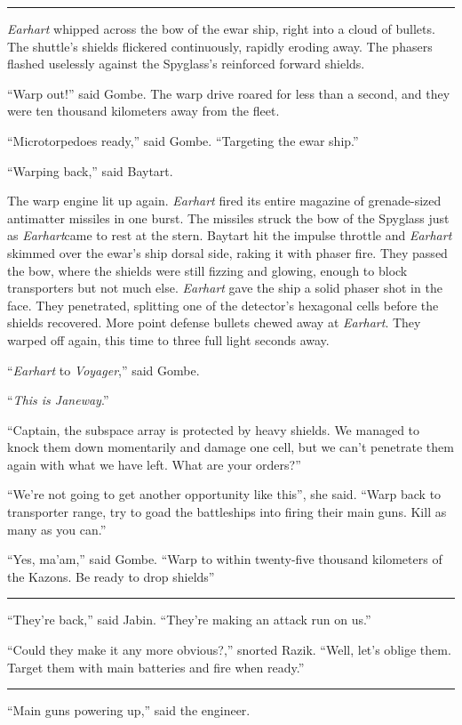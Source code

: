 \documentclass[twoside,letterpaper,12pt]{memoir}
\begin{document}
\fancybreak{\rule{3cm}{0.4 pt}}
\textit{Earhart} whipped across the bow of the ewar ship, right into a cloud of bullets. The shuttle's shields flickered continuously, rapidly eroding away. The phasers flashed uselessly against the Spyglass's reinforced forward shields.

``Warp out!'' said Gombe. The warp drive roared for less than a second, and they were ten thousand kilometers away from the fleet.

``Microtorpedoes ready,'' said Gombe. ``Targeting the ewar ship.''

``Warping back,'' said Baytart.

The warp engine lit up again. \textit{Earhart} fired its entire magazine of grenade-sized antimatter missiles in one burst. The missiles struck the bow of the Spyglass just as \textit{Earhart}came to rest at the stern. Baytart hit the impulse throttle and \textit{Earhart} skimmed over the ewar's ship dorsal side, raking it with phaser fire. They passed the bow, where the shields were still fizzing and glowing, enough to block transporters but not much else. \textit{Earhart} gave the ship a solid phaser shot in the face. They penetrated, splitting one of the detector's hexagonal cells before the shields recovered. More point defense bullets chewed away at \textit{Earhart}. They warped off again, this time to three full light seconds away.

``\textit{Earhart} to \textit{Voyager},'' said Gombe.

``\textit{This is Janeway}.''

``Captain, the subspace array is protected by heavy shields. We managed to knock them down momentarily and damage one cell, but we can't penetrate them again with what we have left. What are your orders?''

``We're not going to get another opportunity like this'', she said. ``Warp back to transporter range, try to goad the battleships into firing their main guns. Kill as many as you can.''

``Yes, ma'am,'' said Gombe. ``Warp to within twenty-five thousand kilometers of the Kazons. Be ready to drop shields''

\fancybreak{\rule{3cm}{0.4 pt}}
``They're back,'' said Jabin. ``They're making an attack run on us.''

``Could they make it any more obvious?,'' snorted Razik. ``Well, let's oblige them. Target them with main batteries and fire when ready.''

\fancybreak{\rule{3cm}{0.4 pt}}
``Main guns powering up,'' said the engineer.
\end{document}
